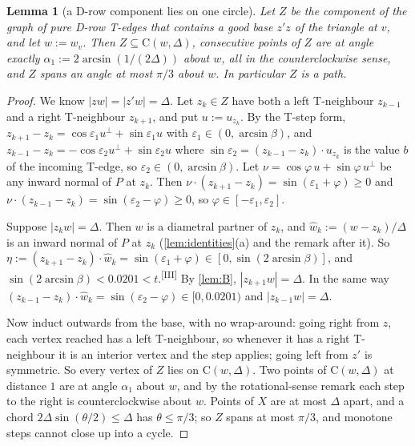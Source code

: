 \documentclass[11pt]{amsart}
\newtheorem{lemma}[theorem]{Lemma}
\theoremstyle{definition}
\theoremstyle{remark}
\newcommand{\eps}{\varepsilon}
\newcommand{\Cc}{\mathrm{C}}      %
\newcommand{\chk}[1]{\textsuperscript{[#1]}}
\begin{document}
\begin{lemma}[a D-row component lies on one circle]\label{lem:Bprime}
Let $Z$ be the component of the graph of pure D-row T-edges that contains a good base $z'z$ of the triangle at $v$, and let $w:=w_v$. Then $Z\subseteq\Cc(w,\Delta)$, consecutive points of $Z$ are at angle exactly $\alpha_1:=2\arcsin(1/(2\Delta))$ about $w$, all in the counterclockwise sense, and $Z$ spans an angle at most $\pi/3$ about $w$. In particular $Z$ is a path.
\end{lemma}
\begin{proof}
We know $|zw|=|z'w|=\Delta$. Let $z_k\in Z$ have both a left T-neighbour $z_{k-1}$ and a right T-neighbour $z_{k+1}$, and put $u:=u_{z_k}$. By the T-step form, $z_{k+1}-z_k=\cos\eps_1u^\perp+\sin\eps_1u$ with $\eps_1\in(0,\arcsin\beta)$, and $z_{k-1}-z_k=-\cos\eps_2u^\perp+\sin\eps_2u$ where $\sin\eps_2=(z_{k-1}-z_k)\cdot u_{z_k}$ is the value $b$ of the incoming T-edge, so $\eps_2\in(0,\arcsin\beta)$. Let $\nu=\cos\varphi\,u+\sin\varphi\,u^\perp$ be any inward normal of $P$ at $z_k$. Then $\nu\cdot(z_{k+1}-z_k)=\sin(\eps_1+\varphi)\ge0$ and $\nu\cdot(z_{k-1}-z_k)=\sin(\eps_2-\varphi)\ge0$, so $\varphi\in[-\eps_1,\eps_2]$.

Suppose $|z_kw|=\Delta$. Then $w$ is a diametral partner of $z_k$, and $\hat w_k:=(w-z_k)/\Delta$ is an inward normal of $P$ at $z_k$ (\cref{lem:identities}(a) and the remark after it). So $\eta:=(z_{k+1}-z_k)\cdot\hat w_k=\sin(\eps_1+\varphi)\in[0,\sin(2\arcsin\beta)]$, and $\sin(2\arcsin\beta)<0.0201<t$.\chk{III} By \cref{lem:B}, $|z_{k+1}w|=\Delta$. In the same way $(z_{k-1}-z_k)\cdot\hat w_k=\sin(\eps_2-\varphi)\in[0,0.0201)$ and $|z_{k-1}w|=\Delta$.

Now induct outwards from the base, with no wrap-around: going right from $z$, each vertex reached has a left T-neighbour, so whenever it has a right T-neighbour it is an interior vertex and the step applies; going left from $z'$ is symmetric. So every vertex of $Z$ lies on $\Cc(w,\Delta)$. Two points of $\Cc(w,\Delta)$ at distance $1$ are at angle $\alpha_1$ about $w$, and by the rotational-sense remark each step to the right is counterclockwise about $w$. Points of $X$ are at most $\Delta$ apart, and a chord $2\Delta\sin(\theta/2)\le\Delta$ has $\theta\le\pi/3$; so $Z$ spans at most $\pi/3$, and monotone steps cannot close up into a cycle.
\end{proof}
\end{document}
